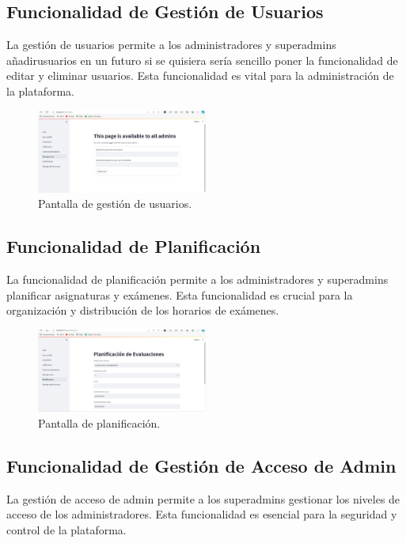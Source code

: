\documentclass{article}
\begin{document}
\subsection{Funcionalidad de Gestión de Usuarios}

La gestión de usuarios permite a los administradores y superadmins añadirusuarios en un futuro si se quisiera sería sencillo poner la funcionalidad de  editar y eliminar usuarios. Esta funcionalidad es vital para la administración de la plataforma.

\begin{figure}[H] \centering \includegraphics[width=0.5\textwidth]{gestion_usuarios.png} \caption{Pantalla de gestión de usuarios.} \end{figure}

\subsection{Funcionalidad de Planificación}

La funcionalidad de planificación permite a los administradores y superadmins planificar asignaturas y exámenes. Esta funcionalidad es crucial para la organización y distribución de los horarios de exámenes.

\begin{figure}[h!] \centering \includegraphics[width=0.5\textwidth]{planificacion.png} \caption{Pantalla de planificación.} \end{figure}

\subsection{Funcionalidad de Gestión de Acceso de Admin}

La gestión de acceso de admin permite a los superadmins gestionar los niveles de acceso de los administradores. Esta funcionalidad es esencial para la seguridad y control de la plataforma.
\end{document}
